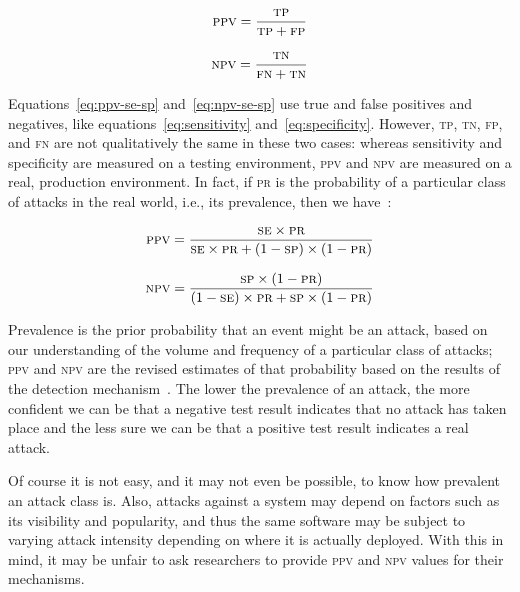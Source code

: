 \documentclass[conference]{IEEEtran}
\begin{document}
\begin{equation}
\textsc{ppv} = \frac{\textsc{tp}}{\textsc{tp} + \textsc{fp}}
\end{equation}

\begin{equation}
\textsc{npv} = \frac{\textsc{tn}}{\textsc{fn} + \textsc{tn}}
\end{equation}

\noindent
Equations~\ref{eq:ppv-se-sp} and~\ref{eq:npv-se-sp} use true and false
positives and negatives, like equations~\ref{eq:sensitivity}
and~\ref{eq:specificity}. However, \textsc{tp}, \textsc{tn},
\textsc{fp}, and \textsc{fn} are not qualitatively the same in these two cases:
whereas sensitivity and specificity are measured on a testing
environment, \textsc{ppv} and \textsc{npv} are measured on a real,
production environment. In fact, if \textsc{pr} is the probability of
a particular class of attacks in the real world,
i.e., its prevalence, then we
have~\cite{linn2004,altman1994}:

\begin{equation}
\textsc{ppv} = \frac{\textsc{se}\times \textsc{pr}}{
\textsc{se}\times \textsc{pr} + (1 - \textsc{sp})\times (1 -
\textsc{pr})}
\label{eq:ppv-se-sp}
\end{equation}

\begin{equation}
\textsc{npv} = \frac{\textsc{sp}\times (1 - \textsc{pr})}{
(1 - \textsc{se})\times \textsc{pr} + \textsc{sp}\times (1 -
\textsc{pr})}
\label{eq:npv-se-sp}
\end{equation}

\noindent
Prevalence is the prior probability that an event might be an attack,
based on our understanding of the volume and frequency of a particular
class of attacks; 
\textsc{ppv} and \textsc{npv} are the revised estimates of that
probability based on the results of the detection
mechanism~\cite{altman1994}. The lower the prevalence of an attack,
the more confident we can be that a negative test result indicates
that no attack has taken place and the less sure we can be that a
positive test result indicates a real attack. 

Of course it is not easy, and it may not even be possible, to know how
prevalent an attack class is. Also, attacks against a system may depend on
factors such as its visibility and popularity, and thus the same
software may be subject to varying attack intensity depending on
where it is actually deployed. With this in mind, it may be unfair to
ask researchers to provide \textsc{ppv} and \textsc{npv} values for
their mechanisms.
\end{document}
